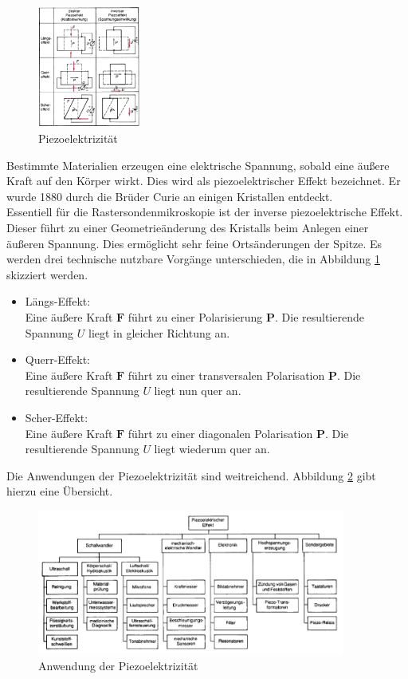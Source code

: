 \begin{figure}
    \includegraphics[width=0.3\textwidth]{Abb/piezo.png}
    \caption{Piezoelektrizität \cite{phying}}
    \label{piezo}
\end{figure}
Bestimmte Materialien erzeugen eine elektrische Spannung, sobald eine äußere Kraft
auf den Körper wirkt. Dies wird als piezoelektrischer Effekt bezeichnet. Er wurde
1880 durch die Brüder Curie an einigen Kristallen entdeckt.\\
Essentiell für die Rastersondenmikroskopie ist der inverse piezoelektrische Effekt.
Dieser führt zu einer Geometrieänderung des Kristalls beim Anlegen einer äußeren 
Spannung. Dies ermöglicht sehr feine Ortsänderungen der Spitze. Es werden drei 
technische nutzbare Vorgänge unterschieden, die in Abbildung \ref{piezo} skizziert
werden.
\begin{itemize}
    \item Längs-Effekt:\\
          Eine äußere Kraft $\textbf{F}$ führt zu einer Polarisierung $\textbf{P}$.
          Die resultierende Spannung $U$ liegt in gleicher Richtung an.
    \item Querr-Effekt:\\
          Eine äußere Kraft $\textbf{F}$ führt zu einer transversalen Polarisation
          $\textbf{P}$. Die resultierende Spannung $U$ liegt nun quer an.
    \item Scher-Effekt:\\
          Eine äußere Kraft $\textbf{F}$ führt zu einer diagonalen Polarisation
          $\textbf{P}$. Die resultierende Spannung $U$ liegt wiederum quer an.
\end{itemize}
Die Anwendungen der Piezoelektrizität sind weitreichend. Abbildung \ref{piezo_anw} 
gibt hierzu eine Übersicht. \cite{phying}
\begin{figure}[hb]
    \centering
    \includegraphics[width=0.9\textwidth]{Abb/piezo_anw.png}
    \caption{Anwendung der Piezoelektrizität \cite{phying}}
    \label{piezo_anw}
\end{figure}

